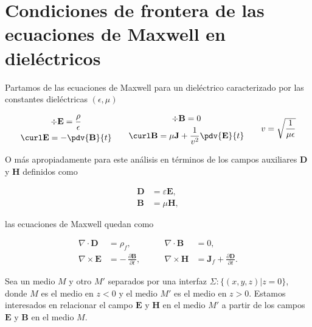 \chapter{Condiciones de frontera de las ecuaciones de Maxwell en dieléctricos}
\label{sec:boundary_conditions_in_dielectrics}


\begin{figure}[h!]
    \centering
\end{figure}

Partamos de las ecuaciones de Maxwell para un dieléctrico caracterizado por 
las constantes dieléctricas $(\epsilon, \mu)$ 

\begin{equation}
    \begin{gathered}
        \div \mathbf{E} = \frac{\rho}{\epsilon} \\
        \curl \mathbf{E} = -\pdv{\mathbf{B}}{t}
    \end{gathered}
    \qquad
    \begin{gathered}
        \div \mathbf{B} = 0 \\
        \curl \mathbf{B} = \mu \mathbf{J} + \frac{1}{v^2}\pdv{\mathbf{E}}{t}
    \end{gathered}
    \qquad
    v = \sqrt{\frac{1}{\mu\epsilon}}
    \label{eq:maxwell_dielectric_basic}
\end{equation}

O más apropiadamente para este análisis en términos de los campos auxiliares $\mathbf D$ y $\mathbf H$ definidos como 

\begin{align}
\mathbf{D} &= \varepsilon \mathbf{E}, \\[6pt]
\mathbf{B} &= \mu \mathbf{H},
\end{align}

las ecuaciones de Maxwell quedan como 

\begin{align}
\nabla \cdot \mathbf{D} &= \rho_f, 
&\qquad \nabla \cdot \mathbf{B} &= 0, \\[6pt]
\nabla \times \mathbf{E} &= -\,\frac{\partial \mathbf{B}}{\partial t}, 
&\qquad \nabla \times \mathbf{H} &= \mathbf{J}_f + \frac{\partial \mathbf{D}}{\partial t}.
\label{eq:maxwell_aux_dielectric}
\end{align}

Sea un medio $M$ y otro $M'$ separados por una interfaz $\Sigma: \{ (x,y,z) | z=0 \}$, donde $M$ es el medio en $z<0$ y el medio $M'$ es el medio en $z>0$. Estamos interesados en relacionar el campo $\mathbf{E}$ y $\mathbf{H}$ en el medio $M'$ a partir de los campos $\mathbf{E}$ y $\mathbf{B}$ en el medio $M$. 


